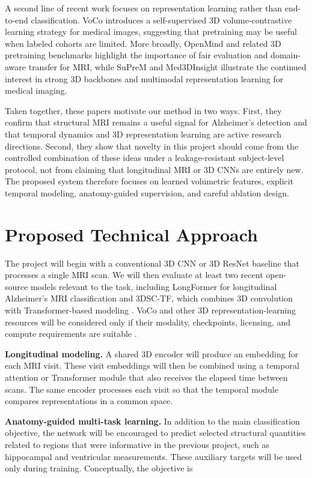 \documentclass[11pt]{article}
\begin{document}
A second line of recent work focuses on representation learning rather than end-to-end classification. VoCo \cite{wu2024voco} introduces a self-supervised 3D volume-contrastive learning strategy for medical images, suggesting that pretraining may be useful when labeled cohorts are limited. More broadly, OpenMind and related 3D pretraining benchmarks highlight the importance of fair evaluation and domain-aware transfer for MRI, while SuPreM \cite{suprem2024} and Med3DInsight \cite{med3dinsight2025} illustrate the continued interest in strong 3D backbones and multimodal representation learning for medical imaging.

Taken together, these papers motivate our method in two ways. First, they confirm that structural MRI remains a useful signal for Alzheimer's detection and that temporal dynamics and 3D representation learning are active research directions. Second, they show that novelty in this project should come from the controlled combination of these ideas under a leakage-resistant subject-level protocol, not from claiming that longitudinal MRI or 3D CNNs are entirely new. The proposed system therefore focuses on learned volumetric features, explicit temporal modeling, anatomy-guided supervision, and careful ablation design.

\section{Proposed Technical Approach}

The project will begin with a conventional 3D CNN or 3D ResNet baseline that processes a single MRI scan. We will then evaluate at least two recent open-source models relevant to the task, including LongFormer for longitudinal Alzheimer's MRI classification \cite{chen2024longformer} and 3DSC-TF, which combines 3D convolution with Transformer-based modeling \cite{qiang2025three}. VoCo and other 3D representation-learning resources will be considered only if their modality, checkpoints, licensing, and compute requirements are suitable \cite{wu2024voco}.

\textbf{Longitudinal modeling.} A shared 3D encoder will produce an embedding for each MRI visit. These visit embeddings will then be combined using a temporal attention or Transformer module that also receives the elapsed time between scans. The same encoder processes each visit so that the temporal module compares representations in a common space.

\textbf{Anatomy-guided multi-task learning.} In addition to the main classification objective, the network will be encouraged to predict selected structural quantities related to regions that were informative in the previous project, such as hippocampal and ventricular measurements. These auxiliary targets will be used only during training.  Conceptually, the objective is
\end{document}
